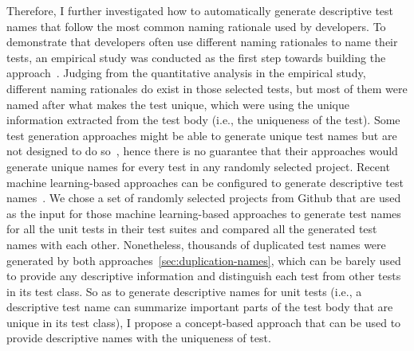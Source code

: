 Therefore, I further investigated how to automatically generate descriptive test names that follow the most common naming rationale used by developers.
%
To demonstrate that developers often use different naming rationales to name their tests, an empirical study was conducted as the first step towards building the approach~\cite{emp-study}.
Judging from the quantitative analysis in the empirical study, different naming rationales do exist in those selected tests, but most of them were named after what makes the test unique, which were using the unique information extracted from the test body (i.e., the uniqueness of the test).
Some test generation approaches might be able to generate unique test names but are not designed to do so~\cite{arcuri2014automated, zhang2015automatically, allamanis2015suggesting, daka2017generating}, hence there is no guarantee that their approaches would generate unique names for every test in any randomly selected project.
%
Recent machine learning-based approaches can be configured to generate descriptive test names~\cite{alon2018code2seq,alon2019code2vec}.
%
We chose a set of randomly selected projects from Github that are used as the input for those machine learning-based approaches to generate test names for all the unit tests in their test suites and compared all the generated test names with each other.
%
Nonetheless, thousands of duplicated test names were generated by both approaches~\cref{sec:duplication-names}, which can be barely used to provide any descriptive information and distinguish each test from other tests in its test class.
%
So as to generate descriptive names for unit tests (i.e., a descriptive test name can summarize important parts of the test body that are unique in its test class), I propose a concept-based approach that can be used to provide descriptive names with the uniqueness of test.


